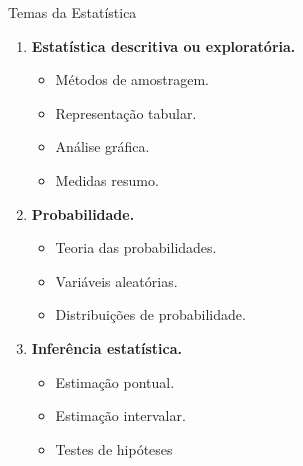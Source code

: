 \documentclass[
  ignorenonframetext,
  serif,
  professionalfont,
  usenames,
  dvipsnames,
  aspectratio = 169]{beamer}
\providecommand{\tightlist}{%
  \setlength{\itemsep}{0pt}\setlength{\parskip}{0pt}}
\renewcommand{\tightlist}{%
  \setlength{\itemsep}{0\baselineskip}
  \setlength{\parskip}{0.25\baselineskip}
}
\def\beginAHalfColumn{\begin{minipage}{0.49\textwidth}}%
\def\endColumns{\end{minipage}}%
\begin{document}
\begin{frame}{Temas da Estatística}
\protect\hypertarget{temas-da-estatuxedstica-1}{}
\beginAHalfColumn

\begin{enumerate}
\tightlist
\item
  \textbf{Estatística descritiva ou exploratória.}

  \begin{itemize}
  \tightlist
  \item
    Métodos de amostragem.
  \item
    Representação tabular.
  \item
    Análise gráfica.
  \item
    Medidas resumo.
  \end{itemize}
\item
  \textbf{Probabilidade.}

  \begin{itemize}
  \tightlist
  \item
    Teoria das probabilidades.
  \item
    Variáveis aleatórias.
  \item
    Distribuições de probabilidade.
  \end{itemize}
\end{enumerate}

\endColumns
\beginAHalfColumn

\begin{enumerate}
\setcounter{enumi}{2}
\tightlist
\item
  \textbf{Inferência estatística.}

  \begin{itemize}
  \tightlist
  \item
    Estimação pontual.
  \item
    Estimação intervalar.
  \item
    Testes de hipóteses
  \end{itemize}
\end{enumerate}

\endColumns
\end{frame}
\end{document}
